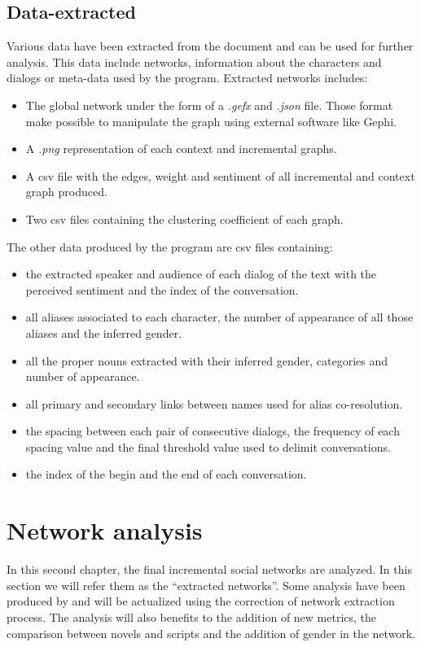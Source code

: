 \documentclass[a4paper, 12pt]{report}
\begin{document}
\newpage
\section{Data-extracted}
Various data have been extracted from the document and can be used for further analysis. This data include networks, information about the characters and dialogs or meta-data used by the program.
Extracted networks includes:
\begin{itemize}
\item The global network under the form of a \textit{.gefx} and \textit{.json} file. Those format make possible to manipulate the graph using external software like Gephi.
\item A \textit{.png} representation of each context and incremental graphs.
\item A csv file with the edges, weight and sentiment of all incremental and context graph produced.
\item Two csv files containing the clustering coefficient of each graph.
\end{itemize}

The other data produced by the program are csv files containing:
\begin{itemize}
\item the extracted speaker and audience of each dialog of the text with the perceived sentiment and the index of the conversation.
\item all aliases associated to each character, the number of appearance of all those aliases and the inferred gender.
\item all the proper nouns extracted with their inferred gender, categories and number of appearance.
\item all primary and secondary links between names used for alias co-resolution.
\item the spacing between each pair of consecutive dialogs, the frequency of each spacing value and the final threshold value used to delimit conversations.
\item the index of the begin and the end of each conversation.
\end{itemize}









\chapter{Network analysis}
In this second chapter, the final incremental social networks are analyzed. In this section we will refer them as the ``extracted networks''. Some analysis have been produced by \cite{original} and will be actualized using the correction of network extraction process. The analysis will also benefits to the addition of new metrics, the comparison between novels and scripts and the addition of gender in the network.
\end{document}
